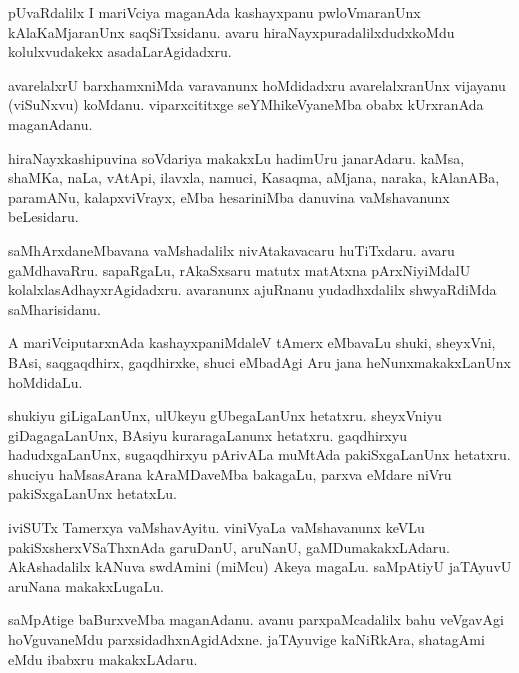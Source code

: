\documentclass{article}
\begin{document}
\begin{mn}
pUvaRdalilx I mariVciya maganAda kashayxpanu pwloVmaranUnx
kAlaKaMjaranUnx saqSiTxsidanu. avaru hiraNayxpuradalilxdudxkoMdu
kolulxvudakekx asadaLarAgidadxru.
\end{mn}

\begin{mn}%
avarelalxrU barxhamxniMda varavanunx hoMdidadxru avarelalxranUnx
vijayanu (viSuNxvu) koMdanu. viparxcititxge seYMhikeVyaneMba obabx
kUrxranAda maganAdanu.
\end{mn}

\begin{mn}%
hiraNayxkashipuvina soVdariya makakxLu hadimUru janarAdaru. kaMsa,
shaMKa, naLa, vAtApi, ilavxla, namuci, Kasaqma, aMjana, naraka,
kAlanABa, paramANu, kalapxviVrayx, eMba hesariniMba danuvina
vaMshavanunx beLesidaru.
\end{mn}

\begin{mn}
saMhArxdaneMbavana vaMshadalilx nivAtakavacaru huTiTxdaru. avaru
gaMdhavaRru. sapaRgaLu, rAkaSxsaru matutx matAtxna pArxNiyiMdalU
kolalxlasAdhayxrAgidadxru. avaranunx ajuRnanu yudadhxdalilx
shwyaRdiMda saMharisidanu.
\end{mn}

\begin{mn}
A mariVciputarxnAda kashayxpaniMdaleV tAmerx eMbavaLu shuki, sheyxVni,
BAsi, saqgaqdhirx, gaqdhirxke, shuci eMbadAgi Aru jana
heNunxmakakxLanUnx hoMdidaLu.
\end{mn}

\begin{mn}%
shukiyu giLigaLanUnx, ulUkeyu gUbegaLanUnx hetatxru. sheyxVniyu
giDagagaLanUnx, BAsiyu kuraragaLanunx hetatxru. gaqdhirxyu
hadudxgaLanUnx, sugaqdhirxyu pArivALa muMtAda pakiSxgaLanUnx
hetatxru. shuciyu haMsasArana kAraMDaveMba bakagaLu, parxva eMdare
niVru pakiSxgaLanUnx hetatxLu.
\end{mn}

\begin{mn}%
iviSUTx Tamerxya vaMshavAyitu. viniVyaLa vaMshavanunx keVLu
pakiSxsherxVSaThxnAda garuDanU, aruNanU,
gaMDumakakxLAdaru. AkAshadalilx kANuva swdAmini (miMcu) Akeya
magaLu. saMpAtiyU jaTAyuvU aruNana makakxLugaLu.
\end{mn}

\begin{mn}
saMpAtige baBurxveMba maganAdanu. avanu parxpaMcadalilx bahu veVgavAgi
hoVguvaneMdu parxsidadhxnAgidAdxne. jaTAyuvige kaNiRkAra, shatagAmi
eMdu ibabxru makakxLAdaru.
\end{mn}
\end{document}
